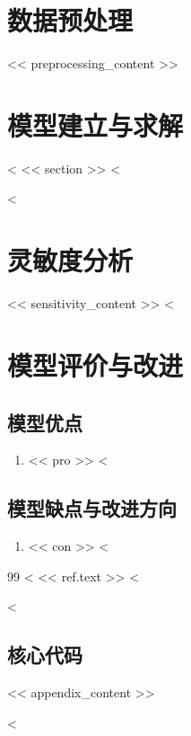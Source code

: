 \documentclass[12pt, a4paper]{article}
\begin{document}
\section{数据预处理}
<< preprocessing_content >>

\section{模型建立与求解}

<%
<< section >>
<%

<%
\section{灵敏度分析}
<< sensitivity_content >>
<%

\section{模型评价与改进}

\subsection{模型优点}
\begin{enumerate}[label=(\arabic*)]
<%
    \item << pro >>
<%
\end{enumerate}

\subsection{模型缺点与改进方向}
\begin{enumerate}[label=(\arabic*)]
<%
    \item << con >>
<%
\end{enumerate}

\newpage
\begin{thebibliography}{99}
<%
     << ref.text >>
<%
\end{thebibliography}

<%
\newpage
\begin{appendices}
\section{核心代码}
<< appendix_content >>
\end{appendices}
<%
\end{document}
